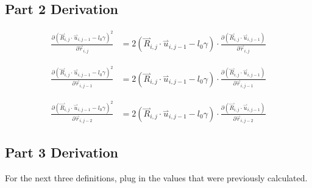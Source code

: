 \documentclass{article}
\renewcommand{\ij}{_{i,j}}
\newcommand{\ijj}{_{i,j-1}}
\newcommand{\ijjj}{_{i,j-2}}
\renewcommand{\part}[2]{\frac{\partial #1 }{\partial #2}}
\newcommand{\harp}{\overset{\rightharpoonup}}
\newcommand{\rij}{\harp r \ij}
\newcommand{\Rij}{\harp R \ij}
\newcommand{\rijj}{\harp r \ijj}
\newcommand{\rijjj}{\harp r \ijjj}
\newcommand{\uijj}{\harp u \ijj}
\begin{document}
\subsection{Part 2 Derivation}

\begin{align*}
  \part{\left(\Rij \cdot \uijj - l_0\gamma\right)^2}{\rij }
  &=
2(\Rij \cdot \uijj - l_0\gamma)
\cdot 
\part{\left(\Rij \cdot \uijj\right)}{\rij}
\end{align*}

\begin{align*}
  \part{\left(\Rij \cdot \uijj - l_0\gamma\right)^2}{\rijj }
  &=
2(\Rij \cdot \uijj - l_0\gamma)
\cdot 
\part{\left(\Rij \cdot \uijj\right)}{\rijj}
\end{align*}

\begin{align*}
  \part{\left(\Rij \cdot \uijj - l_0\gamma\right)^2}{\rijjj }
  &=
2(\Rij \cdot \uijj - l_0\gamma)
\cdot 
\part{\left(\Rij \cdot \uijj\right)}{\rijjj}
\end{align*}

\subsection{Part 3 Derivation}
For the next three definitions, plug in the values that were previously calculated. 
\end{document}
